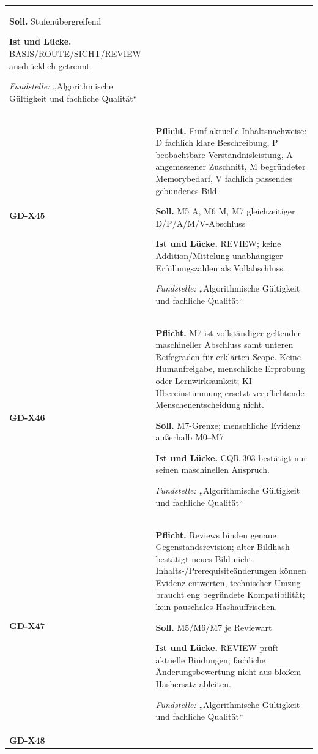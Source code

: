 \begin{longtable}{@{}P{20mm}P{128mm}@{}}
\textbf{Soll.} Stufenübergreifend\par\smallskip
\textbf{Ist und Lücke.} BASIS/ROUTE/SICHT/REVIEW ausdrücklich getrennt.\par\smallskip
\emph{Fundstelle:} „Algorithmische Gültigkeit und fachliche Qualität“\\\addlinespace[5pt]
\label{rule:GD-X45}\textbf{GD-X45} &
\textbf{Pflicht.} Fünf aktuelle Inhaltsnachweise: D fachlich klare Beschreibung, P beobachtbare Verständnisleistung, A angemessener Zuschnitt, M begründeter Memorybedarf, V fachlich passendes gebundenes Bild.\par\smallskip
\textbf{Soll.} M5 A, M6 M, M7 gleichzeitiger D/P/A/M/V-Abschluss\par\smallskip
\textbf{Ist und Lücke.} REVIEW; keine Addition/Mittelung unabhängiger Erfüllungszahlen als Vollabschluss.\par\smallskip
\emph{Fundstelle:} „Algorithmische Gültigkeit und fachliche Qualität“\\\addlinespace[5pt]
\label{rule:GD-X46}\textbf{GD-X46} &
\textbf{Pflicht.} M7 ist vollständiger geltender maschineller Abschluss samt unteren Reifegraden für erklärten Scope. Keine Humanfreigabe, menschliche Erprobung oder Lernwirksamkeit; KI-Übereinstimmung ersetzt verpflichtende Menschenentscheidung nicht.\par\smallskip
\textbf{Soll.} M7-Grenze; menschliche Evidenz außerhalb M0–M7\par\smallskip
\textbf{Ist und Lücke.} CQR-303 bestätigt nur seinen maschinellen Anspruch.\par\smallskip
\emph{Fundstelle:} „Algorithmische Gültigkeit und fachliche Qualität“\\\addlinespace[5pt]
\label{rule:GD-X47}\textbf{GD-X47} &
\textbf{Pflicht.} Reviews binden genaue Gegenstandsrevision; alter Bildhash bestätigt neues Bild nicht. Inhalts-/Prerequisiteänderungen können Evidenz entwerten, technischer Umzug braucht eng begründete Kompatibilität; kein pauschales Hashauffrischen.\par\smallskip
\textbf{Soll.} M5/M6/M7 je Reviewart\par\smallskip
\textbf{Ist und Lücke.} REVIEW prüft aktuelle Bindungen; fachliche Änderungsbewertung nicht aus bloßem Hashersatz ableiten.\par\smallskip
\emph{Fundstelle:} „Algorithmische Gültigkeit und fachliche Qualität“\\\addlinespace[5pt]
\label{rule:GD-X48}\textbf{GD-X48} &

\end{longtable}
